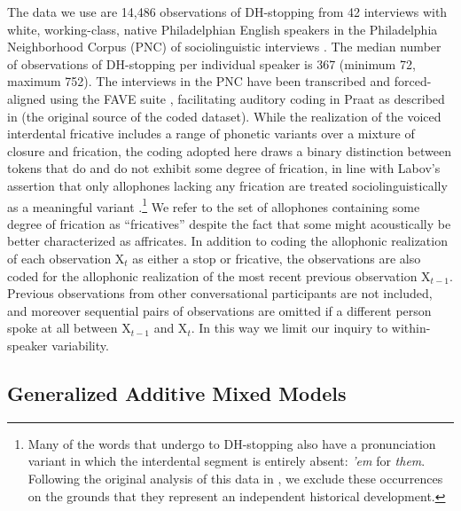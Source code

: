 \documentclass[12pt]{article}
\begin{document}
The data we use are 14,486 observations of DH-stopping from 42 interviews with white, working-class, native Philadelphian English speakers in the Philadelphia Neighborhood Corpus (PNC) of sociolinguistic interviews \citep{Labov:2011a}.  The median number of observations of DH-stopping per individual speaker is 367 (minimum 72, maximum 752). The interviews in the PNC have been transcribed and forced-aligned using the FAVE suite \citep{fave}, facilitating auditory coding in Praat as described in \citet{Tamminga:2014b} (the original source of the coded dataset). While the realization of the voiced interdental fricative includes a range of phonetic variants over a mixture of closure and frication, the coding adopted here draws a binary distinction between tokens that do and do not exhibit some degree of frication, in line with Labov's assertion that only allophones lacking any frication are treated sociolinguistically as a meaningful variant \citep{Labov:2001a}.\footnote{Many of the words that undergo to DH-stopping also have a pronunciation variant in which the interdental segment is entirely absent: \emph{'em} for \emph{them}. Following the original analysis of this data in \citet{Tamminga:2014b}, we exclude these occurrences on the grounds that they represent an independent historical development.} We refer to the set of allophones containing some degree of frication as ``fricatives'' despite the fact that some might acoustically be better characterized as affricates.
In addition to coding the allophonic realization of each observation X$_t$ as either a stop or fricative, the observations are also coded for the allophonic realization of the most recent previous observation X$_{t-1}$. Previous observations from other conversational participants are not included, and moreover sequential pairs of observations are omitted if a different person spoke at all between X$_{t-1}$ and X$_t$. In this way we limit our inquiry to within-speaker variability. 

\subsection{Generalized Additive Mixed Models}
\end{document}
